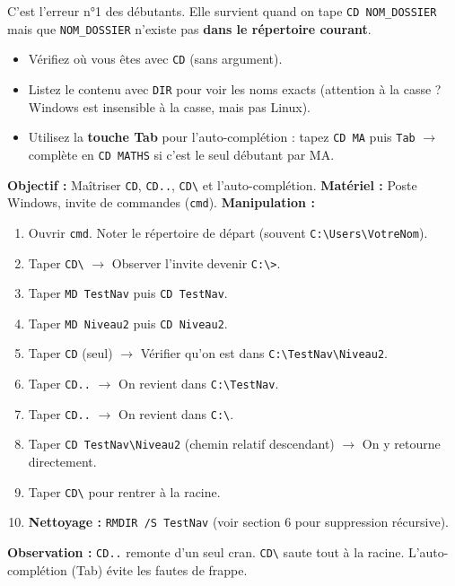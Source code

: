 \documentclass[11pt]{article}
\begin{document}
\begin{attention}
C'est l'erreur n°1 des débutants. Elle survient quand on tape \texttt{CD NOM\_DOSSIER} mais que \texttt{NOM\_DOSSIER} n'existe pas \textbf{dans le répertoire courant}.
\begin{itemize}
    \item Vérifiez où vous êtes avec \texttt{CD} (sans argument).
    \item Listez le contenu avec \texttt{DIR} pour voir les noms exacts (attention à la casse ? Windows est insensible à la casse, mais pas Linux).
    \item Utilisez la \textbf{touche Tab} pour l'auto-complétion : tapez \texttt{CD MA} puis \texttt{Tab} $\to$ complète en \texttt{CD MATHS} si c'est le seul débutant par MA.
\end{itemize}
\end{attention}

\begin{experience}
\textbf{Objectif :} Maîtriser \texttt{CD}, \texttt{CD..}, \texttt{CD\textbackslash} et l'auto-complétion.
\textbf{Matériel :} Poste Windows, invite de commandes (\texttt{cmd}).
\textbf{Manipulation :}
\begin{enumerate}
    \item Ouvrir \texttt{cmd}. Noter le répertoire de départ (souvent \texttt{C:\textbackslash Users\textbackslash VotreNom}).
    \item Taper \texttt{CD\textbackslash} $\to$ Observer l'invite devenir \texttt{C:\textbackslash>}.
    \item Taper \texttt{MD TestNav} puis \texttt{CD TestNav}.
    \item Taper \texttt{MD Niveau2} puis \texttt{CD Niveau2}.
    \item Taper \texttt{CD} (seul) $\to$ Vérifier qu'on est dans \texttt{C:\textbackslash TestNav\textbackslash Niveau2}.
    \item Taper \texttt{CD..} $\to$ On revient dans \texttt{C:\textbackslash TestNav}.
    \item Taper \texttt{CD..} $\to$ On revient dans \texttt{C:\textbackslash}.
    \item Taper \texttt{CD TestNav\textbackslash Niveau2} (chemin relatif descendant) $\to$ On y retourne directement.
    \item Taper \texttt{CD\textbackslash} pour rentrer à la racine.
    \item \textbf{Nettoyage :} \texttt{RMDIR /S TestNav} (voir section 6 pour suppression récursive).
\end{enumerate}
\textbf{Observation :} \texttt{CD..} remonte d'un seul cran. \texttt{CD\textbackslash} saute tout à la racine. L'auto-complétion (Tab) évite les fautes de frappe.
\end{experience}
\end{document}
